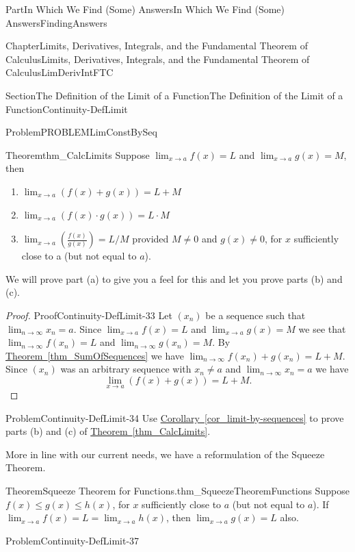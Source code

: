 \documentclass[oneside,10pt,]{book}
\newcommand{\xreffont}{\relax}
\numberwithin{equation}{part}
\def\limit#1#2#3{{\displaystyle\lim_{#1\rightarrow #2}#3}}
\begin{document}
\begin{partptx}{Part}{In Which We Find (Some) Answers}{}{In Which We Find (Some) Answers}{}{}{FindingAnswers}
\begin{chapterptx}{Chapter}{Limits, Derivatives, Integrals, and the Fundamental Theorem of Calculus}{}{Limits, Derivatives, Integrals, and the Fundamental Theorem of Calculus}{}{}{LimDerivIntFTC}
\begin{sectionptx}{Section}{The Definition of the Limit of a Function}{}{The Definition of the Limit of a Function}{}{}{Continuity-DefLimit}
\begin{problem}{Problem}{}{PROBLEMLimConstBySeq}
\end{problem}
\begin{theorem}{Theorem}{}{}{thm_CalcLimits}%
%
Suppose \(\limit{x}{a}{f(x)}=L\) and \(\limit{x}{a}{g(x)}=M\), then%
\begin{enumerate}[label={(\alph*)}]
\item{}\(\displaystyle \limit{x}{a}{\left(f(x)+g(x)\right)}=L+M\)%
\item{}\(\displaystyle \limit{x}{a}{\left(f(x)\cdot g(x)\right)}=L\cdot M\)%
\item{}\(\limit{x}{a}{\left(\frac{f(x)}{g(x)}\right)}=L/M\) provided \(M\ne0\) and \(g(x)\ne{}0\), for \(x\) sufficiently close to a (but not equal to \(a\)).%
\end{enumerate}
%
\end{theorem}
We will prove part (a) to give you a feel for this and let you prove parts (b) and (c).%
\begin{proof}{Proof}{}{Continuity-DefLimit-33}
Let \(\left(x_n\right)\) be a sequence such that  \(\limit{n}{\infty}{x_n}=a\).  Since \(\limit{x}{a}{f(x)} = L\) and \(\limit{x}{a}{g(x)} = M\) we see that \(\limit{n}{\infty}{f(x_n)} = L\) and \(\limit{n}{\infty}{g(x_n)} = M\).  By \hyperref[thm_SumOfSequences]{Theorem~{\xreffont\ref{thm_SumOfSequences}}} we have \(\limit{n}{\infty}{f(x_n)+g(x_n)}=L+M\).  Since \(\left(x_n\right)\) was an arbitrary sequence with \(x_n\ne a\) and \(\limit{n}{\infty}{x_n} = a\) we have%
\begin{equation*}
\limit{x}{a}{\left(f(x)+g(x)\right)} = L+M \text{.}
\end{equation*}
%
\end{proof}
\begin{problem}{Problem}{}{Continuity-DefLimit-34}%
Use \hyperref[cor_limit-by-sequences]{Corollary~{\xreffont\ref{cor_limit-by-sequences}}} to prove parts (b) and (c) of \hyperref[thm_CalcLimits]{Theorem~{\xreffont\ref{thm_CalcLimits}}}.%
\end{problem}
More in line with our current needs, we have a reformulation of the Squeeze Theorem.%
\begin{theorem}{Theorem}{Squeeze Theorem for Functions.}{}{thm_SqueezeTheoremFunctions}%
%
Suppose \(f(x)\le g(x) \le h(x)\), for \(x\) sufficiently close to \(a\) (but not equal to \(a\)).  If \(\limit{x}{a}{f(x)}=L=\limit{x}{a}{h(x)}\), then \(\limit{x}{a}{g(x)}=L\) also.%
\end{theorem}
\begin{problem}{Problem}{}{Continuity-DefLimit-37}%

\end{problem}
\end{sectionptx}
\end{chapterptx}
\end{partptx}
\end{document}

